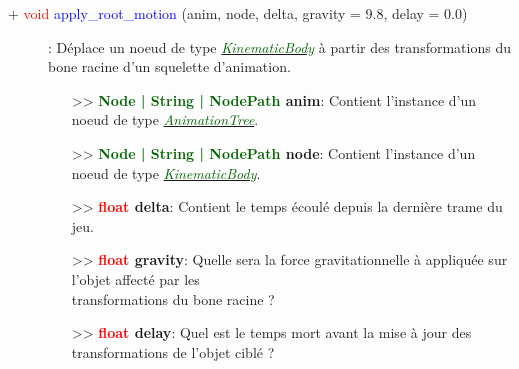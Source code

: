 \documentclass[a4paper, 11pt]{article}
\begin{document}
	\begin{description}
		\item [+ \textcolor{red}{void} \textcolor{blue}{apply\_root\_motion} (anim, node, delta, gravity = 
		9.8, delay = 0.0)]: Déplace un noeud de type
		\href{https://docs.godotengine.org/fr/stable/classes/class_kinematicbody.html}
		{\textit{\textcolor{darkgreen}{KinematicBody}}} à partir des transformations du bone racine d'un 
		squelette d'animation.
		\begin{itemize}
			\item[>> \textbf{\textcolor{darkgreen}{Node | String | NodePath} anim}:] Contient l'instance 
			d'un noeud de type
			\href{https://docs.godotengine.org/fr/stable/classes/class_animationtree.html}
			{\textit{\textcolor{darkgreen}{AnimationTree}}}.
			\item[>> \textbf{\textcolor{darkgreen}{Node | String | NodePath} node}:] Contient l'instance 
			d'un noeud de type
			\href{https://docs.godotengine.org/fr/stable/classes/class_kinematicbody.html}
			{\textit{\textcolor{darkgreen}{KinematicBody}}}.
			\item[>> \textbf{\textcolor{red}{float} delta}:] Contient le temps écoulé depuis la dernière 
			trame du jeu.
			\item[>> \textbf{\textcolor{red}{float} gravity}:] Quelle sera la force gravitationnelle à 
			appliquée sur l'objet affecté par les \\transformations du bone racine ?
			\item[>> \textbf{\textcolor{red}{float} delay}:] Quel est le temps mort avant la mise à jour des
			transformations de l'objet ciblé ?\\
		\end{itemize}
	\end{description}
\end{document}
